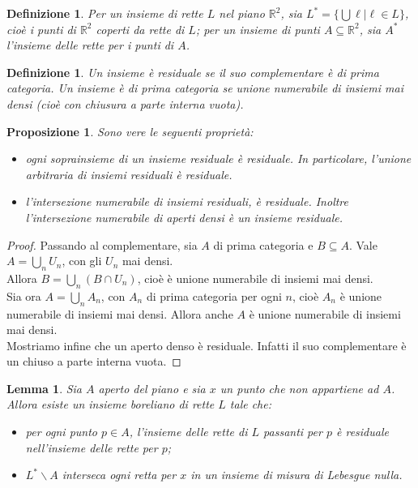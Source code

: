 \documentclass[a4paper, twoside,openright]{article}
\newcommand{\R}{\mathbb{R}}
\newcommand{\<}{\langle}
\renewcommand{\>}{\rangle}
\newtheorem{lemma}[teo]{Lemma}
\newtheorem{defin}[teo]{Definizione}
\newtheorem{prop}[teo]{Proposizione}
\begin{document}
\begin{defin}
Per un insieme di rette $L$ nel piano $\R^2$, sia $L^{*}= \{\bigcup \ell | \ell \in L\}$, cioè i punti di $\R^2$ coperti da rette di $L$; per un insieme di punti $A \subseteq \R^2$, sia $A^{*}$ l'insieme delle rette per i punti di $A$.
\end{defin}

\begin{defin}
	Un insieme è residuale se il suo complementare è di prima categoria. Un insieme è di prima categoria se unione numerabile di insiemi mai densi (cioè con chiusura a parte interna vuota).
\end{defin}

\begin{prop} \label{prop}
	Sono vere le seguenti proprietà:
	\begin{itemize}
		\item ogni soprainsieme di un insieme residuale è residuale. In particolare, l'unione arbitraria di insiemi residuali è residuale.
		\item l'intersezione numerabile di insiemi residuali, è residuale. Inoltre l'intersezione numerabile di aperti densi è un insieme residuale.
	\end{itemize}
\end{prop}
\begin{proof}
	Passando al complementare, sia $A$ di prima categoria e $B \subseteq A$. Vale $A= \bigcup_n U_n$, con gli $U_n$ mai densi.\\
	Allora $B= \bigcup_n(B \cap U_n)$, cioè è unione numerabile di insiemi mai densi.\\
	Sia ora $A=\bigcup_nA_n$, con $A_n$ di prima categoria per ogni $n$, cioè $A_n$ è unione numerabile di insiemi mai densi. Allora anche $A$ è unione numerabile di insiemi mai densi.\\
	Mostriamo infine che un aperto denso è residuale. Infatti il suo complementare è un chiuso a parte interna vuota.	
\end{proof}

\begin{lemma} \label{lemma1}
Sia $A$ aperto del piano e sia $x$ un punto che non appartiene ad $A$. Allora esiste un insieme boreliano di rette $L$ tale che:
\begin{itemize}
	\item per ogni punto $p \in A$, l'insieme delle rette di $L$ passanti per $p$ è residuale nell'insieme delle rette per $p$;
	\item $L^{*} \backslash A$ interseca ogni retta per $x$ in un insieme di misura di Lebesgue nulla.
\end{itemize}
\end{lemma}
\end{document}

